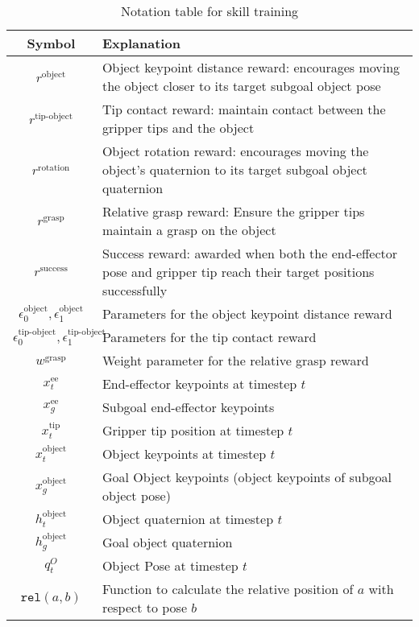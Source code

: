 \begin{table}[h!]
\large
\centering
\begin{adjustbox}{width=0.5\textwidth} %

\begin{tabular}{|c|p{}|} %
\hline
\textbf{Symbol} & \textbf{Explanation} \\ \hline

$r^{\text{object}}$ & Object keypoint distance reward: encourages moving the object closer to its target subgoal object pose \\ \hline
$r^{\text{tip-object}}$ & Tip contact reward: maintain contact between the gripper tips and the object \\ \hline
$r^{\text{rotation}}$ & Object rotation reward: encourages moving the object's quaternion to its target subgoal object quaternion \\ \hline
$r^{\text{grasp}}$ & Relative grasp reward: Ensure the gripper tips
maintain a grasp on the object \\ \hline
$r^{\text{success}}$ & Success reward: awarded when both the end-effector pose and gripper tip reach their target positions successfully \\ \hline
$\epsilon^{\text{object}}_0, \epsilon^{\text{object}}_1$ & Parameters for the object keypoint distance reward \\ \hline
$\epsilon^{\text{tip-object}}_0, \epsilon^{\text{tip-object}}_1$ & Parameters for the tip contact reward \\ \hline
$w^{\text{grasp}}$ & Weight parameter for the relative grasp reward \\ \hline
$x_t^{\text{ee}}$ & End-effector keypoints at timestep $t$ \\ \hline
$x_g^{\text{ee}}$ & Subgoal end-effector keypoints \\ \hline
$x_t^{\text{tip}}$ & Gripper tip position at timestep $t$ \\ \hline
$x_t^{\text{object}}$ & Object keypoints at timestep $t$ \\ \hline
$x_g^{\text{object}}$ & Goal Object keypoints (object keypoints of subgoal object pose) \\ \hline
$h_t^{\text{object}}$ & Object quaternion at timestep $t$ \\ \hline
$h_g^{\text{object}}$ & Goal object quaternion \\ \hline

$q_t^{O}$ & Object Pose at timestep $t$ \\ \hline
$\mathtt{rel}(a, b)$ & Function to calculate the relative position of $a$ with respect to pose $b$ \\ \hline

\end{tabular}
\end{adjustbox}
\caption{Notation table for skill training}
\label{tab:connector_notation}
\end{table}
